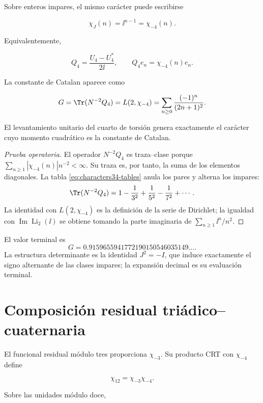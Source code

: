 Sobre enteros impares, el mismo car\'acter puede escribirse

\[
\chi_J(n)=\ii^{n-1}=\chi_{-4}(n).
\]

Equivalentemente,

\begin{equation}
Q_4=\frac{U_4-U_4^*}{2\ii},
\qquad Q_4e_n=\chi_{-4}(n)e_n.
\label{eq:Q4}
\end{equation}

La constante de Catalan aparece como

\begin{equation}
G=\Tr(N^{-2}Q_4)=L(2,\chi_{-4})
=\sum_{n\ge0}\frac{(-1)^n}{(2n+1)^2}.
\label{eq:catalan}
\end{equation}

El levantamiento unitario del cuarto de torsi\'on genera exactamente el
car\'acter cuyo momento cuadr\'atico es la constante de Catalan.

\begin{proof}[Prueba operatoria]
El operador \(N^{-2}Q_4\) es traza--clase porque
\(\sum_{n\ge1}|\chi_{-4}(n)|n^{-2}<\infty\). Su traza es, por tanto, la
suma de los elementos diagonales. La tabla \cref{eq:characters34-tables}
anula los pares y alterna los impares:
\[
\Tr(N^{-2}Q_4)
=1-\frac1{3^2}+\frac1{5^2}-\frac1{7^2}+\cdots.
\]
La identidad con \(L(2,\chi_{-4})\) es la definici\'on de la serie de
Dirichlet; la igualdad con \(\operatorname{Im}\operatorname{Li}_2(\ii)\)
se obtiene tomando la parte imaginaria de
\(\sum_{n\ge1}\ii^n/n^2\).
\end{proof}

El valor terminal es
\[
G=0.9159655941772190150546035149\ldots.
\]
La estructura determinante es la identidad \(J^2=-I\), que induce
exactamente el signo alternante de las clases impares; la expansi\'on decimal
es su evaluaci\'on terminal.

\section{Composici\'on residual tri\'adico--cuaternaria}

El funcional residual m\'odulo tres proporciona \(\chi_{-3}\). Su producto
CRT con \(\chi_{-4}\) define

\begin{equation}
\chi_{12}=\chi_{-3}\chi_{-4}.
\label{eq:chi12}
\end{equation}

Sobre las unidades m\'odulo doce,

